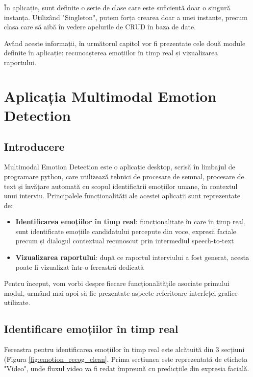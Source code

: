 \documentclass[a4paper, 12pt]{report}
\begin{document}
	În aplicație, sunt definite o serie de clase care este suficientă doar o singură instanța. Utilizând "Singleton", putem forța crearea doar a unei instanțe, precum clasa care să aibă în vedere apelurile de CRUD în baza de date. 
	
	Având aceste informații, în următorul capitol vor fi prezentate cele două module definite în aplicație: recunoașterea emoțiilor în timp real și vizualizarea raportului.
	
	\clearpage
	\section{Aplicația Multimodal Emotion Detection}
	\subsection{Introducere}
	
	Multimodal Emotion Detection este o aplicație desktop, scrisă în limbajul de programare python, care utilizează tehnici de procesare de semnal, procesare de text și învățare automată cu scopul identificării emoțiilor umane, în contextul unui interviu. Principalele funcționalități ale acestei aplicații sunt reprezentate de:
	\begin{itemize}
	 	\item \textbf{Identificarea emoțiilor în timp real}: funcționalitate în care în timp real, sunt identificate emoțiile candidatului percepute din voce, expresii faciale precum și dialogul contextual recunoscut prin intermediul speech-to-text
		\item \textbf{Vizualizarea raportului}: după ce raportul interviului a fost generat, acesta poate fi vizualizat într-o fereastră dedicată
	\end{itemize}
	
	Pentru început, vom vorbi despre fiecare funcționalitățile asociate primului modul, urmând mai apoi să fie prezentate aspecte referitoare interfeței grafice utilizate.
	
	\clearpage
	\subsection{Identificare emoțiilor în timp real}
	Fereastra pentru identificarea emoțiilor în timp real este alcătuită din 3 secțiuni (Figura \ref{fig:emotion_recog_clean}. Prima secțiunea este reprezentată de eticheta "Video", unde fluxul video va fi redat împreună cu predicțiile din expresia facială.
	
\end{document}
